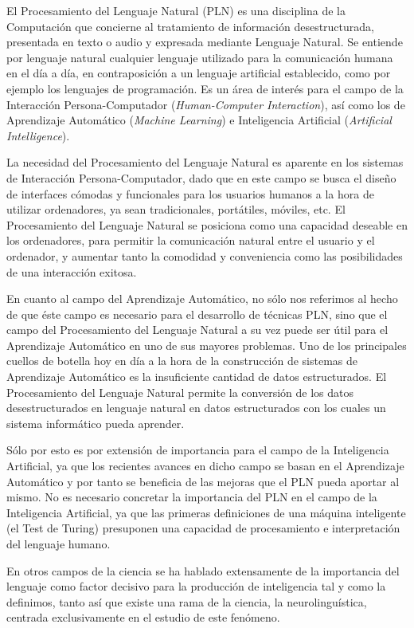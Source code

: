 \lhead{\emph{\ChapterOne{}}}
El Procesamiento del Lenguaje Natural (PLN) es una disciplina de la Computación que concierne al tratamiento de información desestructurada, presentada en texto o audio y expresada mediante Lenguaje Natural.
%
Se entiende por lenguaje natural cualquier lenguaje utilizado para la comunicación humana en el día a día, en contraposición a un lenguaje artificial establecido, como por ejemplo los lenguajes de programación.
%
Es un área de interés para el campo de la Interacción Persona-Computador (\textit{Human-Computer Interaction}), así como los de Aprendizaje Automático (\textit{Machine Learning}) e Inteligencia Artificial (\textit{Artificial Intelligence}).

La necesidad del Procesamiento del Lenguaje Natural es aparente en los sistemas de Interacción Persona-Computador, dado que en este campo se busca el diseño de interfaces cómodas y funcionales para los usuarios humanos a la hora de utilizar ordenadores, ya sean tradicionales, portátiles, móviles, etc.
%
El Procesamiento del Lenguaje Natural se posiciona como una capacidad deseable en los ordenadores, para permitir la comunicación natural entre el usuario y el ordenador, y aumentar tanto la comodidad y conveniencia como las posibilidades de una interacción exitosa.

En cuanto al campo del Aprendizaje Automático, no sólo nos referimos al hecho de que éste campo es necesario para el desarrollo de técnicas PLN, sino que el campo del Procesamiento del Lenguaje Natural a su vez puede ser útil para el Aprendizaje Automático en uno de sus mayores problemas.
%
Uno de los principales cuellos de botella hoy en día a la hora de la construcción de sistemas de Aprendizaje Automático es la insuficiente cantidad de datos estructurados. El Procesamiento del Lenguaje Natural permite la conversión de los datos desestructurados en lenguaje natural en datos estructurados con los cuales un sistema informático pueda aprender.

Sólo por esto es por extensión de importancia para el campo de la Inteligencia Artificial, ya que los recientes avances en dicho campo se basan en el Aprendizaje Automático y por tanto se beneficia de las mejoras que el PLN pueda aportar al mismo.
%
No es necesario concretar la importancia del PLN en el campo de la Inteligencia Artificial, ya que las primeras definiciones de una máquina inteligente (el Test de Turing) presuponen una capacidad de procesamiento e interpretación del lenguaje humano.

En otros campos de la ciencia se ha hablado extensamente de la importancia del lenguaje como factor decisivo para la producción de inteligencia tal y como la definimos, tanto así que existe una rama de la ciencia, la neurolinguística, centrada exclusivamente en el estudio de este fenómeno.